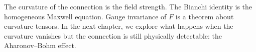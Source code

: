 The curvature of the connection is the field strength. The Bianchi identity is the homogeneous Maxwell equation. Gauge invariance of $F$ is a theorem about curvature tensors. In the next chapter, we explore what happens when the curvature vanishes but the connection is still physically detectable: the Aharonov--Bohm effect.
